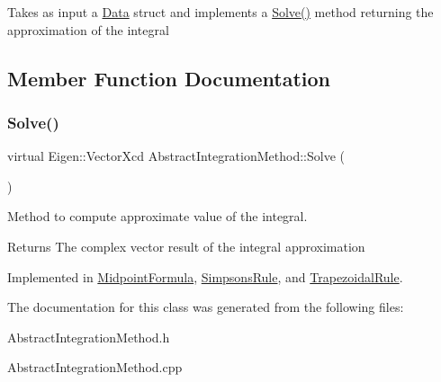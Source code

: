 Takes as input a \hyperlink{struct_data}{Data} struct and implements a \hyperlink{class_abstract_integration_method_af76e5bdce7d0b139d07e920fa29c1c34}{Solve()} method returning the approximation of the integral 

\subsection{Member Function Documentation}
\mbox{\label{class_abstract_integration_method_af76e5bdce7d0b139d07e920fa29c1c34}} 
\subsubsection{\texorpdfstring{Solve()}{Solve()}}
{\footnotesize\ttfamily virtual Eigen\+::\+Vector\+Xcd Abstract\+Integration\+Method\+::\+Solve (\begin{DoxyParamCaption}{ }\end{DoxyParamCaption})\hspace{0.3cm}{\ttfamily [pure virtual]}}



Method to compute approximate value of the integral. 

\begin{DoxyReturn}{Returns}
The complex vector result of the integral approximation 
\end{DoxyReturn}


Implemented in \hyperlink{class_midpoint_formula_add437323dfb0bc181b0051c5aaf80ba7}{Midpoint\+Formula}, \hyperlink{class_simpsons_rule_a9925b07e44be9fc1644d3cbeb742078c}{Simpsons\+Rule}, and \hyperlink{class_trapezoidal_rule_ae822d86948bdc8876bf524cd620e11b8}{Trapezoidal\+Rule}.



The documentation for this class was generated from the following files\+:\begin{DoxyCompactItemize}
\item 
Abstract\+Integration\+Method.\+h\item 
Abstract\+Integration\+Method.\+cpp\end{DoxyCompactItemize}
